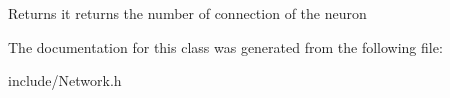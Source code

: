 \begin{DoxyReturn}{Returns}
it returns the number of connection of the neuron 
\end{DoxyReturn}


The documentation for this class was generated from the following file\-:\begin{DoxyCompactItemize}
\item 
include/Network.\-h\end{DoxyCompactItemize}
